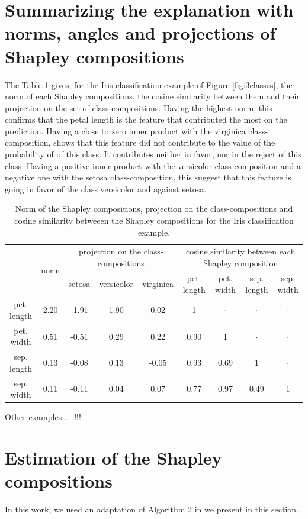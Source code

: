 \documentclass{article}
\theoremstyle{plain}
\theoremstyle{definition}
\theoremstyle{remark}
\begin{document}
\newpage
\section{Summarizing the explanation with norms, angles and projections of Shapley compositions}
\label{app:summarize}

The Table \ref{tab:normiris} gives, for the Iris classification example of Figure \ref{fig:3classes}, the norm of each Shapley compositions, the cosine similarity between them and their projection on the set of class-compositions. Having the highest norm, this confirms that the petal length is the feature that contributed the most on the prediction. Having a close to zero inner product with the virginica class-composition, shows that this feature did not contribute to the value of the probability of of this class. It contributes neither in favor, nor in the reject of this class. Having a positive inner product with the versicolor class-composition and a negative one with the setosa class-composition, this suggest that this feature is going in favor of the class versicolor and against setosa.
\begin{table}
  \centering
  \caption{Norm of the Shapley compositions, projection on the class-compositions and cosine similarity betweeen the Shapley compositions for the Iris classification example.}
  \begin{tabular}{c|c|ccc|cccc|}
    \cline{2-9}
    & \multirow{2}{*}{norm} & \multicolumn{3}{c|}{projection on the class-compositions} & \multicolumn{4}{c|}{cosine similarity between each Shapley composition} \\
    \cline{3-9}
     & & setosa & versicolor & virginica & pet. length & pet. width & sep. length & sep. width \\
    \hline
    pet. length & 2.20  & -1.91 & 1.90 & 0.02 & 1 &$\cdot$ &$\cdot$ &$\cdot$ \\
    pet. width & 0.51 & -0.51 & 0.29 & 0.22 & 0.90 & 1 &$\cdot$ &$\cdot$ \\
    sep. length & 0.13 & -0.08 & 0.13 & -0.05 & 0.93 & 0.69 & 1 &$\cdot$ \\
    sep. width & 0.11 & -0.11 & 0.04 & 0.07 & 0.77 & 0.97 & 0.49 &1 \\
    \hline
  \end{tabular}
  \label{tab:normiris}
\end{table}

Other examples ... !!!

\newpage
\section{Estimation of the Shapley compositions}
\label{app:algo}
In this work, we used an adaptation of Algorithm 2 in \cite{vstrumbelj2014explaining} we present in this section.
\end{document}
